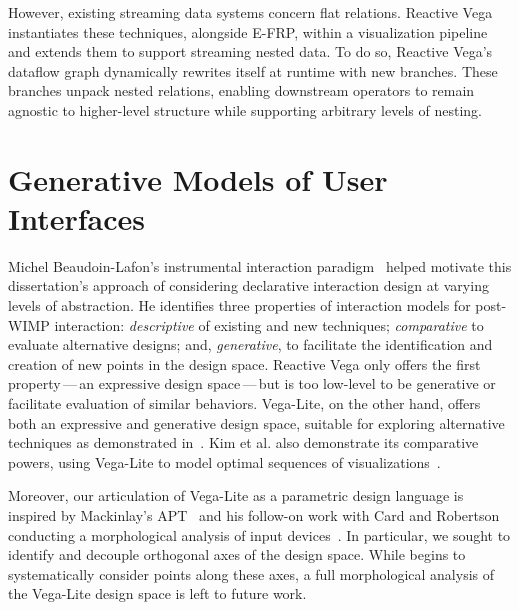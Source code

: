 However, existing streaming data systems concern flat relations. Reactive Vega
instantiates these techniques, alongside E-FRP, within a visualization pipeline
and extends them to support streaming nested data. To do so, Reactive Vega's
dataflow graph dynamically rewrites itself at runtime with new branches. These
branches unpack nested relations, enabling downstream operators to remain
agnostic to higher-level structure while supporting arbitrary levels of nesting.

\section{Generative Models of User Interfaces}

Michel Beaudoin-Lafon's instrumental interaction
paradigm~\cite{beaudouin:instrumental} helped motivate this dissertation's
approach of considering declarative interaction design at varying levels of
abstraction. He identifies three properties of interaction models for post-WIMP
interaction: \emph{descriptive} of existing and new techniques;
\emph{comparative} to evaluate alternative designs; and, \emph{generative}, to
facilitate the identification and creation of new points in the design space.
Reactive Vega only offers the first property\,---\,an expressive design
space\,---\,but is too low-level to be generative or facilitate evaluation of
similar behaviors. Vega-Lite, on the other hand, offers both an expressive and
generative design space, suitable for exploring alternative techniques as
demonstrated in~. Kim et al. also demonstrate its
comparative powers, using Vega-Lite to model optimal sequences of
visualizations~\cite{kim:graphscape}.

Moreover, our articulation of Vega-Lite as a parametric design language is
inspired by Mackinlay's APT~\cite{mackinlay:apt} and his follow-on work with
Card and Robertson conducting a morphological analysis of input
devices~\cite{card:morphological}. In particular, we sought to identify and
decouple orthogonal axes of the design space. While 
begins to systematically consider points along these axes, a full morphological
analysis of the Vega-Lite design space is left to future work.